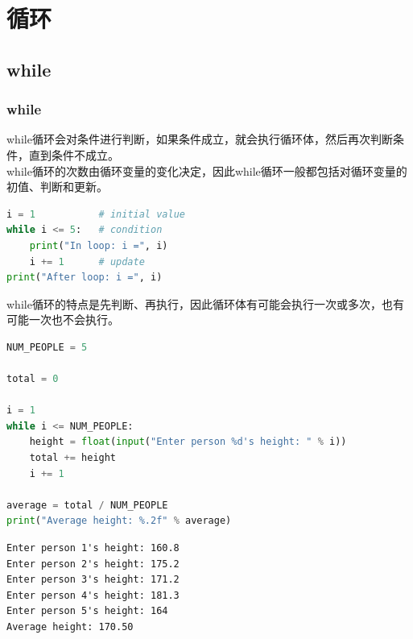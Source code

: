 \chapter{循环}

\section{while}

\subsection{while}

while循环会对条件进行判断，如果条件成立，就会执行循环体，然后再次判断条件，直到条件不成立。\\

while循环的次数由循环变量的变化决定，因此while循环一般都包括对循环变量的初值、判断和更新。

\vspace{-0.5cm}

\begin{lstlisting}[language=Python]
i = 1			# initial value
while i <= 5:	# condition
	print("In loop: i =", i)
	i += 1		# update
print("After loop: i =", i)
\end{lstlisting}

while循环的特点是先判断、再执行，因此循环体有可能会执行一次或多次，也有可能一次也不会执行。\\


\begin{lstlisting}[language=Python]
NUM_PEOPLE = 5

total = 0

i = 1
while i <= NUM_PEOPLE:
	height = float(input("Enter person %d's height: " % i))
	total += height
	i += 1

average = total / NUM_PEOPLE
print("Average height: %.2f" % average)
\end{lstlisting}

\begin{tcolorbox}
	\begin{verbatim}
Enter person 1's height: 160.8
Enter person 2's height: 175.2
Enter person 3's height: 171.2
Enter person 4's height: 181.3
Enter person 5's height: 164
Average height: 170.50
\end{verbatim}
\end{tcolorbox}

\vspace{0.5cm}

